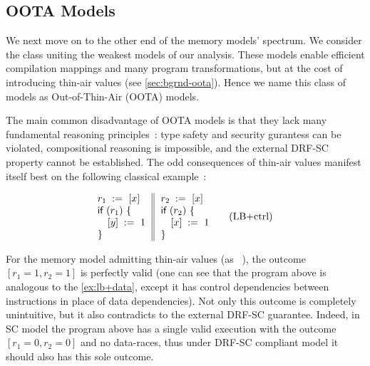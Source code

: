 \subsection{OOTA Models}

We next move on to the other end of the memory models' spectrum. 
We consider the class uniting the weakest models of our analysis.
These models enable efficient compilation mappings and 
many program transformations, but at the cost of 
introducing thin-air values (see \cref{sec:bgrnd-oota}).
Hence we name this class of models as Out-of-Thin-Air (OOTA) models. 
 
The main common disadvantage of OOTA models is that 
they lack many fundamental reasoning 
principles~\cite{Boehm-Demsky:MSPC14, Batty-al:ESOP15}:
type safety and security gurantess can be violated, 
compositional reasoning is impossible, and
the external DRF-SC property cannot be established. 
The odd consequences of thin-air values manifest 
itself best on the following classical example~\cite{Boehm-Demsky:MSPC14}: 

\begin{equation*}
\inarrII{
  \readInst{}{r_1}{x}      \\
  \kw{if} {(r_1)} ~\{      \\
  \quad\writeInst{}{y}{1}  \\
  \}
}{
  \readInst{}{r_2}{x}      \\
  \kw{if} {(r_2)} ~\{      \\
  \quad\writeInst{}{x}{1}  \\
  \}
}
\tag{LB+ctrl}\label{ex:lb+ctrl}
\end{equation*}

For the memory model admitting thin-air values 
(as \eg \CMM~\cite{Batty-al:POPL11}), 
the outcome $[r_1=1, r_2=1]$ is perfectly valid
(one can see that the program above is analogous 
to the \ref{ex:lb+data}, except it has 
control dependencies between instructions 
in place of data dependencies).
Not only this outcome is completely unintuitive,
but it also contradicts to the external DRF-SC guarantee.
Indeed, in SC model the program above has 
a single valid execution with the outcome $[r_1=0, r_2=0]$ 
and no data-races, thus under DRF-SC compliant model 
it should also has this sole outcome.  

